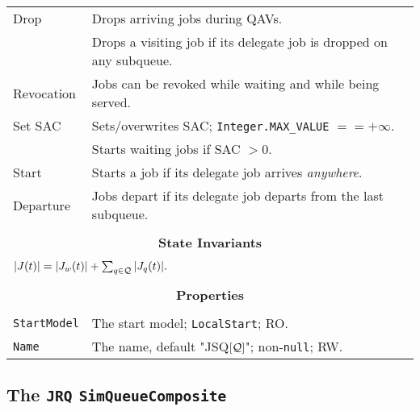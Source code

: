 \begin{tabular}{|l|l|}
	\hline
	Drop & Drops arriving jobs during QAVs. \\
	& Drops a visiting job if its delegate job is dropped on any subqueue. \\
	\hline
	Revocation & Jobs can be revoked while waiting and while being served. \\
	\hline
	Set SAC & Sets/overwrites SAC; \lstinline|Integer.MAX_VALUE| $== +\infty$. \\
	& Starts waiting jobs if SAC $> 0$. \\
	\hline
	Start & Starts a job if its delegate job arrives {\em anywhere}. \\
	\hline
	Departure & Jobs depart if its delegate job departs from the last subqueue. \\
	\hline
	\multicolumn{2}{|c|}{} \\
	\multicolumn{2}{|c|}{\bf State  Invariants} \\
	\multicolumn{2}{|c|}{} \\
	\hline
	\multicolumn{2}{|l|}{$|J(t)| = |J_{w}(t)| + \sum_{q \in \cal{Q}} |J_{q}(t)|.$} \\
	\hline
	\multicolumn{2}{|c|}{} \\
	\multicolumn{2}{|c|}{\bf Properties} \\
	\multicolumn{2}{|c|}{} \\
	\hline
	\lstinline|StartModel| & The start model; \lstinline|LocalStart|; RO. \\
	\hline
	\lstinline|Name|       & The name, default "JSQ$[\cal{Q}]$"; non-\lstinline|null|; RW. \\
	\hline
\end{tabular}

\subsection{The \lstinline{JRQ} \lstinline{SimQueueComposite}}
\label{sec:JRQ}

